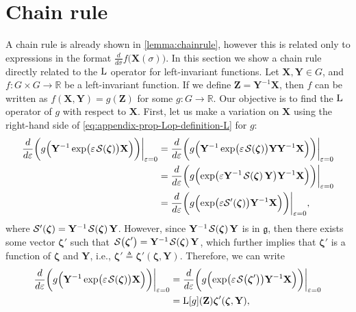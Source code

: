 \section{Chain rule}
A chain rule is already shown in \cref{lemma:chainrule}, however this is related only to expressions in the format $\frac{d}{d\sigma}f\bigl(\mathbf{X}(\sigma)\bigr)$. In this section we show a chain rule directly related to the $\operatorname{L}$ operator for left-invariant functions. Let $\mathbf{X},\mathbf{Y}\in G$, and $f : G \times G \to \mathbb{R}$ be a left-invariant function. If we define $\mathbf{Z} = \mathbf{Y}^{-1}\mathbf{X}$, then $f$ can be written as $f(\mathbf{X},\mathbf{Y}) = g(\mathbf{Z})$ for some $g:G\to\mathbb{R}$. Our objective is to find the $\operatorname{L}$ operator of $g$ with respect to $\mathbf{X}$. First, let us make a variation on $\mathbf{X}$ using the right-hand side of \eqref{eq:appendix-prop-Lop-definition-L} for $g$:
\begin{align}
    \frac{d}{d\varepsilon}\biggl(g\Bigl(\mathbf{Y}^{-1}\exp\bigl(\varepsilon\SL[\boldsymbol{\zeta}]\bigr)\mathbf{X}\Bigr)\biggr)\biggr|_{\varepsilon=0} &= \frac{d}{d\varepsilon}\biggl(g\Bigl(\mathbf{Y}^{-1}\exp\bigl(\varepsilon\SL[\boldsymbol{\zeta}]\bigr)\mathbf{Y}\mathbf{Y}^{-1}\mathbf{X}\Bigr)\biggr)\biggr|_{\varepsilon=0}\\
    &= \frac{d}{d\varepsilon}\biggl(g\Bigl(\exp\bigl(\varepsilon\mathbf{Y}^{-1}\SL[\boldsymbol{\zeta}]\mathbf{Y}\bigr)\mathbf{Y}^{-1}\mathbf{X}\Bigr)\biggr)\biggr|_{\varepsilon=0} \\
    &= \frac{d}{d\varepsilon}\biggl(g\Bigl(\exp\bigl(\varepsilon\mathcal{S}'(\boldsymbol{\zeta})\bigr)\mathbf{Y}^{-1}\mathbf{X}\Bigr)\biggr)\biggr|_{\varepsilon=0},
\end{align}
where $\mathcal{S}'(\boldsymbol{\zeta}) = \mathbf{Y}^{-1}\SL[\boldsymbol{\zeta}]\mathbf{Y}$. However, since $\mathbf{Y}^{-1}\SL[\boldsymbol{\zeta}]\mathbf{Y}$ is in $\mathfrak{g}$, then there exists some vector $\boldsymbol{\zeta}'$ such that $\SL[\boldsymbol{\zeta}'] = \mathbf{Y}^{-1}\SL[\boldsymbol{\zeta}]\mathbf{Y}$, which further implies that $\boldsymbol{\zeta}'$ is a function of $\boldsymbol{\zeta}$ and $\mathbf{Y}$, i.e., $\boldsymbol{\zeta}' \triangleq \boldsymbol{\zeta}'(\boldsymbol{\zeta}, \mathbf{Y})$. Therefore, we can write
\begin{align}
    \frac{d}{d\varepsilon}\biggl(g\Bigl(\mathbf{Y}^{-1}\exp\bigl(\varepsilon\SL[\boldsymbol{\zeta}]\bigr)\mathbf{X}\Bigr)\biggr)\biggr|_{\varepsilon=0} &= \frac{d}{d\varepsilon}\biggl(g\Bigl(\exp\bigl(\varepsilon\SL[\boldsymbol{\zeta}']\bigr)\mathbf{Y}^{-1}\mathbf{X}\Bigr)\biggr)\biggr|_{\varepsilon=0}\\
    &= \Lop[g](\mathbf{Z})\boldsymbol{\zeta}'(\boldsymbol{\zeta}, \mathbf{Y}) \label{appendix-prop-Lop-chain-rule-LgZ-zeta-prime},
\end{align}
